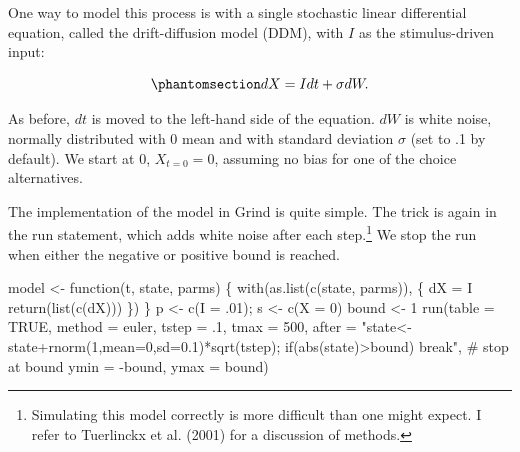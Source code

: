 \documentclass[
  a4paper,
  DIV=11,
  numbers=noendperiod,
  oneside]{scrreprt}
\newenvironment{Shaded}{}{}
\newcommand{\AttributeTok}[1]{\textcolor[rgb]{0.84,0.23,0.29}{#1}}
\newcommand{\CommentTok}[1]{\textcolor[rgb]{0.42,0.45,0.49}{#1}}
\newcommand{\ConstantTok}[1]{\textcolor[rgb]{0.00,0.36,0.77}{#1}}
\newcommand{\ControlFlowTok}[1]{\textcolor[rgb]{0.84,0.23,0.29}{#1}}
\newcommand{\DecValTok}[1]{\textcolor[rgb]{0.00,0.36,0.77}{#1}}
\newcommand{\FunctionTok}[1]{\textcolor[rgb]{0.44,0.26,0.76}{#1}}
\newcommand{\NormalTok}[1]{\textcolor[rgb]{0.14,0.16,0.18}{#1}}
\newcommand{\OtherTok}[1]{\textcolor[rgb]{0.44,0.26,0.76}{#1}}
\newcommand{\SpecialCharTok}[1]{\textcolor[rgb]{0.00,0.36,0.77}{#1}}
\newcommand{\StringTok}[1]{\textcolor[rgb]{0.01,0.18,0.38}{#1}}
\begin{document}
One way to model this process is with a single stochastic linear
differential equation, called the drift-diffusion model (DDM), with
\(I\) as the stimulus-driven input:

\begin{equation}\phantomsection\label{eq-ch4n-6-old-26}{
dX = Idt + \sigma dW.
}\end{equation}

As before, \(dt\) is moved to the left-hand side of the equation. \(dW\)
is white noise, normally distributed with 0 mean and with standard
deviation \(\sigma\) (set to .1 by default). We start at 0,
\(X_{t = 0} = 0\), assuming no bias for one of the choice alternatives.

The implementation of the model in Grind is quite simple. The trick is
again in the run statement, which adds white noise after each
step.\footnote{Simulating this model correctly is more difficult than
  one might expect. I refer to Tuerlinckx et al. (2001) for a discussion
  of methods.} We stop the run when either the negative or positive
bound is reached.

\begin{Shaded}
\begin{Highlighting}[]
\NormalTok{model }\OtherTok{\textless{}{-}} \ControlFlowTok{function}\NormalTok{(t, state, parms) \{}
  \FunctionTok{with}\NormalTok{(}\FunctionTok{as.list}\NormalTok{(}\FunctionTok{c}\NormalTok{(state, parms)), \{}
\NormalTok{    dX }\OtherTok{=}\NormalTok{ I}
    \FunctionTok{return}\NormalTok{(}\FunctionTok{list}\NormalTok{(}\FunctionTok{c}\NormalTok{(dX)))}
\NormalTok{  \})}
\NormalTok{\}}
\NormalTok{p }\OtherTok{\textless{}{-}} \FunctionTok{c}\NormalTok{(}\AttributeTok{I =}\NormalTok{ .}\DecValTok{01}\NormalTok{); s }\OtherTok{\textless{}{-}} \FunctionTok{c}\NormalTok{(}\AttributeTok{X =} \DecValTok{0}\NormalTok{)}
\NormalTok{bound }\OtherTok{\textless{}{-}} \DecValTok{1}
\FunctionTok{run}\NormalTok{(}\AttributeTok{table =} \ConstantTok{TRUE}\NormalTok{, }\AttributeTok{method =} \StringTok{\textquotesingle{}euler\textquotesingle{}}\NormalTok{, }\AttributeTok{tstep =}\NormalTok{ .}\DecValTok{1}\NormalTok{,}
    \AttributeTok{tmax =} \DecValTok{500}\NormalTok{, }\AttributeTok{after =} \StringTok{"state\textless{}{-}state+rnorm(1,mean=0,sd=0.1)*sqrt(tstep);}
\StringTok{    if(abs(state)\textgreater{}bound) break"}\NormalTok{, }\CommentTok{\# stop at bound}
    \AttributeTok{ymin =} \SpecialCharTok{{-}}\NormalTok{bound, }\AttributeTok{ymax =}\NormalTok{ bound)}
\end{Highlighting}
\end{Shaded}
\end{document}

